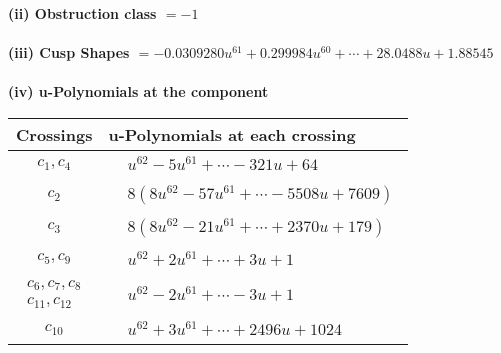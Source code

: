 \documentclass[1p]{elsarticle_modified}
\theoremstyle{definition}
\begin{document}
\flushleft \textbf{(ii) Obstruction class $= -1$}\\~\\
\flushleft \textbf{(iii) Cusp Shapes $= -0.0309280 u^{61}+0.299984 u^{60}+\cdots+28.0488 u+1.88545$}\\~\\
\newpage\renewcommand{\arraystretch}{1}
\flushleft \textbf{(iv) u-Polynomials at the component}\newline \\
\begin{tabular}{m{50pt}|m{274pt}}
Crossings & \hspace{64pt}u-Polynomials at each crossing \\
\hline $$\begin{aligned}c_{1},c_{4}\end{aligned}$$&$\begin{aligned}
&u^{62}-5 u^{61}+\cdots-321 u+64
\end{aligned}$\\
\hline $$\begin{aligned}c_{2}\end{aligned}$$&$\begin{aligned}
&8(8 u^{62}-57 u^{61}+\cdots-5508 u+7609)
\end{aligned}$\\
\hline $$\begin{aligned}c_{3}\end{aligned}$$&$\begin{aligned}
&8(8 u^{62}-21 u^{61}+\cdots+2370 u+179)
\end{aligned}$\\
\hline $$\begin{aligned}c_{5},c_{9}\end{aligned}$$&$\begin{aligned}
&u^{62}+2 u^{61}+\cdots+3 u+1
\end{aligned}$\\
\hline $$\begin{aligned}c_{6},c_{7},c_{8}\\c_{11},c_{12}\end{aligned}$$&$\begin{aligned}
&u^{62}-2 u^{61}+\cdots-3 u+1
\end{aligned}$\\
\hline $$\begin{aligned}c_{10}\end{aligned}$$&$\begin{aligned}
&u^{62}+3 u^{61}+\cdots+2496 u+1024
\end{aligned}$\\
\hline
\end{tabular}\\~\\
\end{document}
